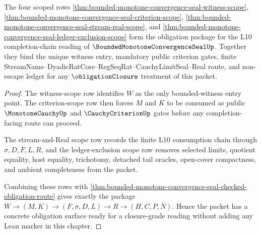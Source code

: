 \begin{theorem}
\label{thm:bounded-monotone-convergence-seal-obligation-scope-package}
The four scoped rows
\autoref{thm:bounded-monotone-convergence-seal-witness-scope},
\autoref{thm:bounded-monotone-convergence-seal-criterion-scope},
\autoref{thm:bounded-monotone-convergence-seal-stream-real-scope}, and
\autoref{thm:bounded-monotone-convergence-seal-ledger-exclusion-scope}
form the obligation package for the L10 completion-chain reading of $\BoundedMonotoneConvergenceSealUp$. Together they bind the unique witness entry, mandatory public criterion gates, finite StreamName--DyadicRatCore--RegSeqRat--CauchyLimitSeal--Real route, and non-escape ledger for any $\obligationClosure$ treatment of this packet.
\end{theorem}
\begin{proof}
The witness-scope row identifies $W$ as the only bounded-witness entry point. The criterion-scope row then forces $M$ and $K$ to be consumed as public $\MonotoneCauchyUp$ and $\CauchyCriterionUp$ gates before any completion-facing route can proceed.

The stream-and-Real scope row records the finite L10 consumption chain through $\sigma,D,F,L,R$, and the ledger-exclusion scope row removes selected limits, quotient equality, host equality, trichotomy, detached tail oracles, open-cover compactness, and ambient completeness from the packet.

Combining these rows with \autoref{thm:bounded-monotone-convergence-seal-checked-obligation-route} gives exactly the package $W \to (M,K) \to (F,\sigma,D,L) \to R \to (H,C,P,N)$. Hence the packet has a concrete obligation surface ready for a closure-grade reading without adding any Lean marker in this chapter.
\end{proof}

